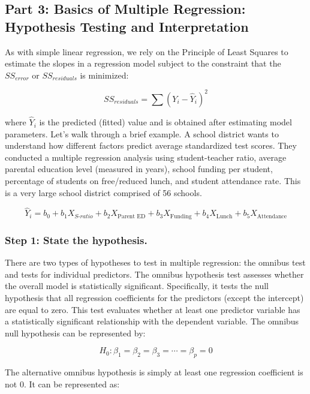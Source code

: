 \documentclass[
  letterpaper,
  DIV=11,
  numbers=noendperiod]{scrreprt}
\begin{document}
\subsection{Part 3: Basics of Multiple Regression: Hypothesis Testing
and
Interpretation}\label{part-3-basics-of-multiple-regression-hypothesis-testing-and-interpretation}

As with simple linear regression, we rely on the Principle of Least
Squares to estimate the slopes in a regression model subject to the
constraint that the \(SS_{error}\) or \(SS_{residuals}\) is minimized:

\[
SS_{residuals} = \sum (Y_i - \hat{Y}_i)^2
\]

where \(\hat{Y}_i\) is the predicted (fitted) value and is obtained
after estimating model parameters. Let's walk through a brief example. A
school district wants to understand how different factors predict
average standardized test scores. They conducted a multiple regression
analysis using student-teacher ratio, average parental education level
(measured in years), school funding per student, percentage of students
on free/reduced lunch, and student attendance rate. This is a very large
school district comprised of 56 schools.

\[
\hat{Y}_i = b_0 + b_1 X_{S\text{-}ratio} + b_2 X_{\text{Parent ED}} + b_3 X_{\text{Funding}} + b_4 X_{\text{Lunch}} + b_5 X_{\text{Attendance}}
\]

\subsubsection*{Step 1: State the
hypothesis.}\label{step-1-state-the-hypothesis.-1}

There are two types of hypotheses to test in multiple regression: the
omnibus test and tests for individual predictors. The omnibus hypothesis
test assesses whether the overall model is statistically significant.
Specifically, it tests the null hypothesis that all regression
coefficients for the predictors (except the intercept) are equal to
zero. This test evaluates whether at least one predictor variable has a
statistically significant relationship with the dependent variable. The
omnibus null hypothesis can be represented by:

\[
H_0: \beta_1 = \beta_2 = \beta_3 = \cdots = \beta_p = 0
\]

The alternative omnibus hypothesis is simply at least one regression
coefficient is not 0. It can be represented as:\,\,
\end{document}
